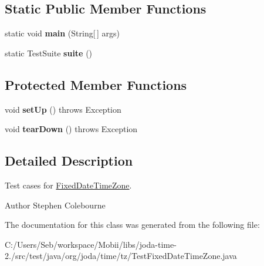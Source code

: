\subsection*{Static Public Member Functions}
\begin{DoxyCompactItemize}
\item 
\hypertarget{classorg_1_1joda_1_1time_1_1tz_1_1_test_fixed_date_time_zone_aaab36b232083aa5cab82d36a99d714a2}{static void {\bfseries main} (String\mbox{[}$\,$\mbox{]} args)}\label{classorg_1_1joda_1_1time_1_1tz_1_1_test_fixed_date_time_zone_aaab36b232083aa5cab82d36a99d714a2}

\item 
\hypertarget{classorg_1_1joda_1_1time_1_1tz_1_1_test_fixed_date_time_zone_a974c17cc30a3d860baf3c98d06358ee2}{static Test\-Suite {\bfseries suite} ()}\label{classorg_1_1joda_1_1time_1_1tz_1_1_test_fixed_date_time_zone_a974c17cc30a3d860baf3c98d06358ee2}

\end{DoxyCompactItemize}
\subsection*{Protected Member Functions}
\begin{DoxyCompactItemize}
\item 
\hypertarget{classorg_1_1joda_1_1time_1_1tz_1_1_test_fixed_date_time_zone_a0261e6f2160c6d6c649de66611e1c6e7}{void {\bfseries set\-Up} ()  throws Exception }\label{classorg_1_1joda_1_1time_1_1tz_1_1_test_fixed_date_time_zone_a0261e6f2160c6d6c649de66611e1c6e7}

\item 
\hypertarget{classorg_1_1joda_1_1time_1_1tz_1_1_test_fixed_date_time_zone_ac0bbfb930ca161a1db87b097bfec9505}{void {\bfseries tear\-Down} ()  throws Exception }\label{classorg_1_1joda_1_1time_1_1tz_1_1_test_fixed_date_time_zone_ac0bbfb930ca161a1db87b097bfec9505}

\end{DoxyCompactItemize}


\subsection{Detailed Description}
Test cases for \hyperlink{classorg_1_1joda_1_1time_1_1tz_1_1_fixed_date_time_zone}{Fixed\-Date\-Time\-Zone}.

\begin{DoxyAuthor}{Author}
Stephen Colebourne 
\end{DoxyAuthor}


The documentation for this class was generated from the following file\-:\begin{DoxyCompactItemize}
\item 
C\-:/\-Users/\-Seb/workspace/\-Mobii/libs/joda-\/time-\/2./src/test/java/org/joda/time/tz/Test\-Fixed\-Date\-Time\-Zone.\-java\end{DoxyCompactItemize}
